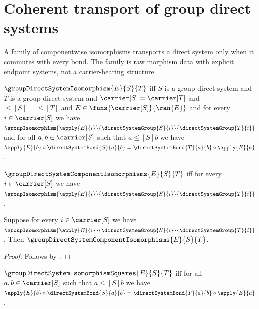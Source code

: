 

\section{Coherent transport of group direct systems}

A family of componentwise isomorphisms transports a direct system only when
it commutes with every bond.  The family is raw morphism data with explicit
endpoint systems, not a carrier-bearing structure.

\begin{definition}\label{group_direct_system_isomorphism}
    $\groupDirectSystemIsomorphism{E}{S}{T}$ iff
        $S$ is a group direct system and
        $T$ is a group direct system and
        $\carrier[S]=\carrier[T]$ and
        $\leq[S]=\leq[T]$ and
        $E\in\funs{\carrier[S]}{\ran{E}}$ and
        for every $i\in\carrier[S]$ we have
            $\groupIsomorphism{\apply{E}{i}}
                {\directSystemGroup{S}{i}}
                {\directSystemGroup{T}{i}}$ and
        for all $a,b\in\carrier[S]$ such that
            $a\mathrel{\leq[S]}b$ we have
            $\apply{E}{b}\circ\directSystemBond{S}{a}{b}
                =\directSystemBond{T}{a}{b}\circ\apply{E}{a}$.
\end{definition}

\begin{definition}\label{group_direct_system_component_isomorphisms}
    $\groupDirectSystemComponentIsomorphisms{E}{S}{T}$ iff
        for every $i\in\carrier[S]$ we have
            $\groupIsomorphism{\apply{E}{i}}
                {\directSystemGroup{S}{i}}
                {\directSystemGroup{T}{i}}$.
\end{definition}

\begin{proposition}\label{group_direct_system_component_isomorphisms_intro}
    Suppose for every $i\in\carrier[S]$ we have
        $\groupIsomorphism{\apply{E}{i}}
            {\directSystemGroup{S}{i}}
            {\directSystemGroup{T}{i}}$.
    Then $\groupDirectSystemComponentIsomorphisms{E}{S}{T}$.
\end{proposition}
\begin{proof}
    Follows by .
\end{proof}

\begin{definition}\label{group_direct_system_isomorphism_squares}
    $\groupDirectSystemIsomorphismSquares{E}{S}{T}$ iff
        for all $a,b\in\carrier[S]$ such that
            $a\mathrel{\leq[S]}b$ we have
            $\apply{E}{b}\circ\directSystemBond{S}{a}{b}=
                \directSystemBond{T}{a}{b}\circ\apply{E}{a}$.
\end{definition}

